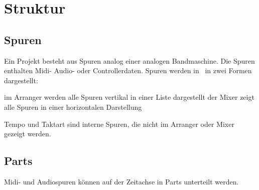 \chapter{Struktur}
  \section{Spuren}

      Ein Projekt besteht aus Spuren analog einer analogen Bandmaschine.
      Die Spuren enthalten Midi- Audio- oder Controllerdaten.
      Spuren werden in \M\ in zwei Formen dargestellt:

      \blank[big]
       im Arranger werden alle Spuren vertikal in einer
            Liste dargestellt
       der Mixer zeigt alle Spuren in einer horizontalen
            Darstellung
      \par\blank[big]

      Tempo und Taktart sind interne Spuren, die nicht im Arranger oder
      Mixer gezeigt werden.

  \section{Parts}

      Midi- und Audiospuren können auf der Zeitachse in Parts unterteilt
      werden.

